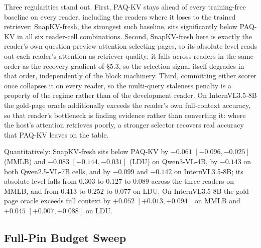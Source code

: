 \documentclass[letterpaper]{article} %
\newcommand{\paqc}{\textsc{PAQ-KV}}
\begin{document}
\begin{table}[t]
\centering\footnotesize
\setlength{\tabcolsep}{2.5pt}

\caption{Baseline arm family on the three second readers at the 80-document
development pins (LDU = LongDocURL, MMLB = MMLongBench-Doc), $b=5\%$. The
\paqc{}, ColQwen2-fresh, and full-context rows are the cached values from the
cross-reader ports (identical to Table~\ref{tab:crossreader}); the remaining
arms are new runs with matched page-set semantics. Development-grade.}
\label{tab:xrb}
\end{table}

Three regularities stand out. First, \paqc{} stays ahead of every
training-free baseline on every reader, including the readers where it loses
to the trained retriever: SnapKV-fresh, the strongest such baseline, sits
significantly below \paqc{} in all six reader-cell combinations. Second,
SnapKV-fresh here is exactly the reader's own question-preview attention
selecting pages, so its absolute level reads out each reader's
attention-as-retriever quality; it falls across readers in the same order as
the recovery gradient of \S5.3, so the selection
signal itself degrades in that order, independently of the block machinery.
Third, committing either scorer once collapses it on every reader, so the
multi-query staleness penalty is a property of the regime rather than of the
development reader. On InternVL3.5-8B the gold-page oracle additionally
exceeds the reader's own full-context accuracy, so that reader's bottleneck
is finding evidence rather than converting it: where the host's attention
retrieves poorly, a stronger selector recovers real accuracy that \paqc{}
leaves on the table.

Quantitatively: SnapKV-fresh sits below \paqc{} by $-0.061$
$[-0.096,-0.025]$ (MMLB) and $-0.083$ $[-0.144,-0.031]$ (LDU) on
Qwen3-VL-4B, by $-0.143$ on both Qwen2.5-VL-7B cells, and by $-0.099$ and
$-0.142$ on InternVL3.5-8B; its absolute level falls from $0.303$ to $0.127$
to $0.089$ across the three readers on MMLB, and from $0.413$ to
$0.252$ to $0.077$ on LDU. On InternVL3.5-8B the gold-page oracle
exceeds full context by $+0.052$ $[+0.013,+0.094]$ on MMLB and $+0.045$
$[+0.007,+0.088]$ on LDU.

\subsection{Full-Pin Budget Sweep}\label{app:budget-sweep}
\end{document}
